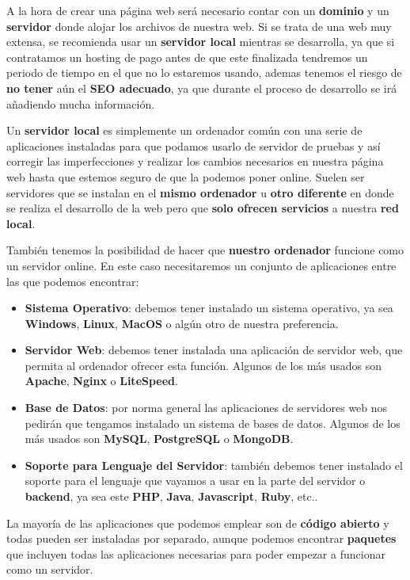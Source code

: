A la hora de crear una página web será necesario contar con un \textbf{dominio} y un \textbf{servidor} donde alojar los archivos de nuestra web. Si se trata de una web muy extensa, se recomienda usar un \textbf{servidor local} mientras se desarrolla, ya que si contratamos un hosting de pago antes de que este finalizada tendremos un periodo de tiempo en el que no lo estaremos usando, ademas tenemos el riesgo de \textbf{no tener} aún el \textbf{SEO adecuado}, ya que durante el proceso de desarrollo se irá añadiendo mucha información.

Un \textbf{servidor local} es simplemente un ordenador común con una serie de aplicaciones instaladas para que podamos usarlo de servidor de pruebas y así corregir las imperfecciones y realizar los cambios necesarios en nuestra página web hasta que estemos seguro de que la podemos poner online. Suelen ser servidores que se instalan en el \textbf{mismo ordenador} u \textbf{otro diferente} en donde se realiza el desarrollo de la web pero que \textbf{solo ofrecen servicios} a nuestra \textbf{red local}.

También tenemos la posibilidad de hacer que \textbf{nuestro ordenador} funcione como un servidor online. En este caso necesitaremos un conjunto de aplicaciones entre las que podemos encontrar:

\begin{itemize}
    \item \textbf{Sistema Operativo}: debemos tener instalado un sistema operativo, ya sea \textbf{Windows}, \textbf{Linux}, \textbf{MacOS} o algún otro de nuestra preferencia.
    \item \textbf{Servidor Web}: debemos tener instalada una aplicación de servidor web, que permita al ordenador ofrecer esta función. Algunos de los más usados son \textbf{Apache}, \textbf{Nginx} o \textbf{LiteSpeed}.
    \item \textbf{Base de Datos}: por norma general las aplicaciones de servidores web nos pedirán que tengamos instalado un sistema de bases de datos. Algunos de los más usados son \textbf{MySQL}, \textbf{PostgreSQL} o \textbf{MongoDB}.
    \item \textbf{Soporte para Lenguaje del Servidor}: también debemos tener instalado el soporte para el lenguaje que vayamos a usar en la parte del servidor o \textbf{backend}, ya sea este \textbf{PHP}, \textbf{Java}, \textbf{Javascript}, \textbf{Ruby}, etc..
\end{itemize}

La mayoría de las aplicaciones que podemos emplear son de \textbf{código abierto} y todas pueden ser instaladas por separado, aunque podemos encontrar \textbf{paquetes} que incluyen todas las aplicaciones necesarias para poder empezar a funcionar como un servidor.

